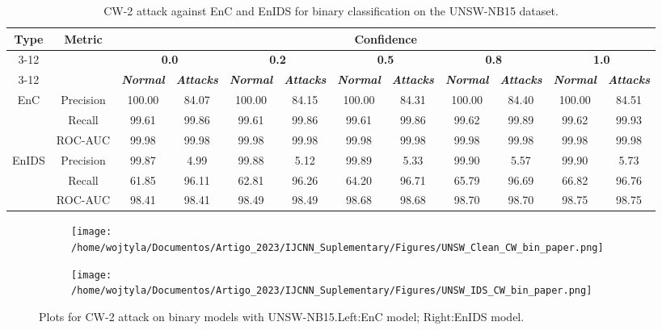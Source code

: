 \documentclass[conference]{IEEEtran}
\begin{document}
	
	\begin{table}[H]
		\caption{CW-2 attack against EnC and EnIDS for binary classification on the UNSW-NB15 dataset.}
		\small
		\setlength{\tabcolsep}{1pt}
		\centering
		\label{tab:unsw_bin_cw}		
		\begin{tabular}{|c|c|c|c|c|c|c|c|c|c|c|c|}
			\hline
			\multirow{4}{*}{\textbf{Type}} & \multirow{4}{*}{\textbf{Metric}}& \multicolumn{10}{c|}{\textbf{Confidence}} \\
			\cline{3-12}
			&  & \multicolumn{2}{c|}{\textbf{0.0}} & \multicolumn{2}{c|}{\textbf{0.2}} & \multicolumn{2}{c|}{\textbf{0.5}} & \multicolumn{2}{c|}{\textbf{0.8}} & \multicolumn{2}{c|}{\textbf{1.0}}   \\
			\cline{3-12}
			&  &  \textbf{\textsl{Normal}} & \textbf{\textsl{Attacks}} & \textbf{\textsl{Normal}} & \textbf{\textsl{Attacks}} & \textbf{\textsl{Normal}} & \textbf{\textsl{Attacks}} & \textbf{\textsl{Normal}} & \textbf{\textsl{Attacks}} & \textbf{\textsl{Normal}} & \textbf{\textsl{Attacks}} \\
			\hline
			\multirow{3}{*}{EnC} & Precision & 100.00 & 84.07 & 100.00 & 84.15 & 100.00 & 84.31 & 100.00 & 84.40 & 100.00 & 84.51
			\\
			
			& Recall & 99.61 & 99.86 & 99.61 & 99.86 & 99.61 & 99.86 & 99.62 & 99.89 & 99.62 & 99.93
			\\
			
			& ROC-AUC & 99.98 & 99.98 & 99.98 & 99.98 & 99.98 & 99.98 & 99.98 & 99.98 & 99.98 & 99.98
			\\
			\hline
			\multirow{3}{*}{EnIDS} & Precision & 99.87 & 4.99 & 99.88 & 5.12 & 99.89 & 5.33 & 99.90 & 5.57 & 99.90 & 5.73
			\\
			
			& Recall & 61.85 & 96.11 & 62.81 & 96.26 & 64.20 & 96.71 & 65.79 & 96.69 & 66.82 & 96.76
			\\
			
			& ROC-AUC & 98.41 & 98.41 & 98.49 & 98.49 & 98.68 & 98.68 & 98.70 & 98.70 & 98.75 & 98.75
			\\
			\hline
		\end{tabular}		
	\end{table}
	
	\begin{figure}[H]
		\centering
		\begin{subfigure}[b]{0.45\textwidth}
			\texttt{[image: /home/wojtyla/Documentos/Artigo\_2023/IJCNN\_Suplementary/Figures/UNSW\_Clean\_CW\_bin\_paper.png]}
			\label{fig:1}
		\end{subfigure}
		\hfill
		\begin{subfigure}[b]{0.45\textwidth}
			\texttt{[image: /home/wojtyla/Documentos/Artigo\_2023/IJCNN\_Suplementary/Figures/UNSW\_IDS\_CW\_bin\_paper.png]}
			\label{fig:4}
		\end{subfigure}
		\caption{Plots for CW-2 attack on binary models with UNSW-NB15.Left:EnC model; Right:EnIDS model.}
		\label{fig:unsw_cw_bin}
	\end{figure}
	
\end{document}
